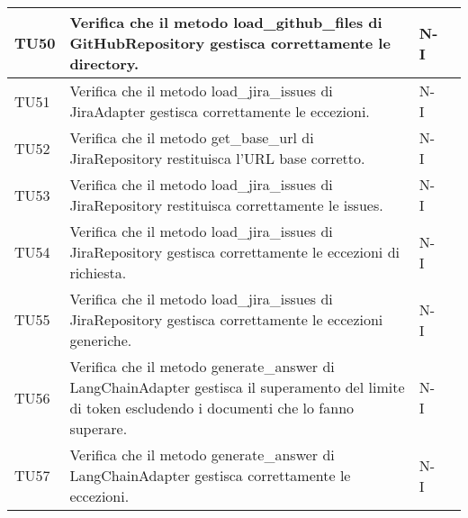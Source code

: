 \begin{table}[h!]
\begin{tabularx}{\textwidth}{|p{}|X|p{}|p{}|}
    TU50 & Verifica che il metodo load\_github\_files di GitHubRepository gestisca correttamente le directory. &  N-I \\ \hline
    TU51 & Verifica che il metodo load\_jira\_issues di JiraAdapter gestisca correttamente le eccezioni. &  N-I \\ \hline
    TU52 & Verifica che il metodo get\_base\_url di JiraRepository restituisca l'URL base corretto. &  N-I \\ \hline
    TU53 & Verifica che il metodo load\_jira\_issues di JiraRepository restituisca correttamente le issues. &  N-I \\ \hline
    TU54 & Verifica che il metodo load\_jira\_issues di JiraRepository gestisca correttamente le eccezioni di richiesta. &  N-I \\ \hline
    TU55 & Verifica che il metodo load\_jira\_issues di JiraRepository gestisca correttamente le eccezioni generiche. &  N-I \\ \hline
    TU56 & Verifica che il metodo generate\_answer di LangChainAdapter gestisca il superamento del limite di token escludendo i documenti che lo fanno superare. &  N-I \\ \hline
    TU57 & Verifica che il metodo generate\_answer di LangChainAdapter gestisca correttamente le eccezioni. &  N-I \\ \hline
    \end{tabularx}
\end{table}

\newpage


